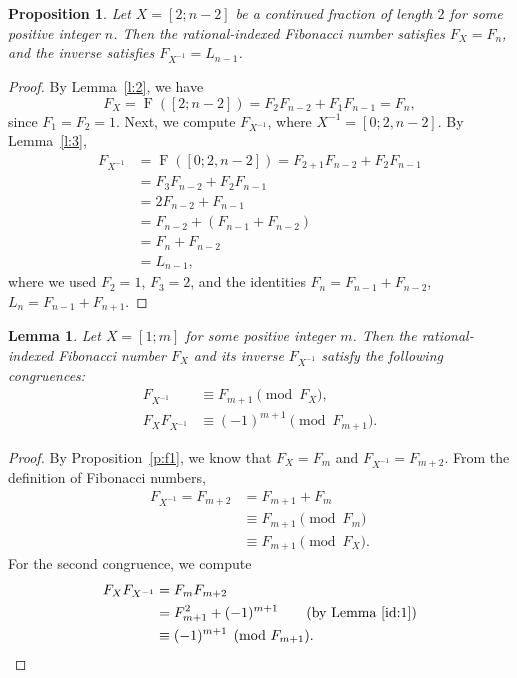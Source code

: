 \documentclass[11pt,reqno]{amsart}
\numberwithin{equation}{section}
\numberwithin{table}{section}
\numberwithin{figure}{section}
\DeclareMathOperator{\F}{F}
\theoremstyle{plain}
\newtheorem{lemma}[thm]{Lemma}
\newtheorem{proposition}[thm]{Proposition}
\theoremstyle{definition}
\theoremstyle{remark}
\begin{document}
\begin{proposition}\label{p:f2}	Let $X = [2; n-2]$ be a continued fraction of length $2$ for some positive integer $n$. 	Then the rational-indexed Fibonacci number satisfies $F_X = F_n$, and the inverse satisfies $F_{X^{-1}} = L_{n-1}$.\end{proposition}\begin{proof}	By Lemma~\ref{l:2}, we have	\[	F_X = \F([2; n-2]) = F_2F_{n-2} + F_1F_{n-1} = F_n, 	\]	since $F_1 = F_2 = 1$.		Next, we compute $F_{X^{-1}}$, where $X^{-1} = [0; 2, n-2]$. By Lemma~\ref{l:3},	\begin{align*}		F_{X^{-1}} &= \F([0; 2, n-2]) = F_{2+1}F_{n-2} + F_2F_{n-1} \\		&= F_3F_{n-2} + F_2F_{n-1} \\		&= 2F_{n-2} + F_{n-1} \\		&= F_{n-2} + (F_{n-1}+F_{n-2}) \\		&= F_{n} + F_{n-2} \\		&= L_{n-1},	\end{align*}	where we used $F_2 = 1$, $F_3 = 2$, and the identities $F_n = F_{n-1} + F_{n-2}$, $L_n = F_{n-1}+F_{n+1}$.\end{proof}\begin{lemma}\label{in:f1}	Let $X = [1; m]$ for some positive integer $m$. 	Then the rational-indexed Fibonacci number $F_X$ and its inverse $F_{X^{-1}}$ satisfy the following congruences:	\begin{align}		F_{X^{-1}} &\equiv F_{m+1} \pmod{F_X}, \\		F_XF_{X^{-1}} &\equiv (-1)^{m+1} \pmod{F_{m+1}}.	\end{align}\end{lemma}
\begin{proof}	By Proposition~\ref{p:f1}, we know that $F_X = F_m$ and $F_{X^{-1}} = F_{m+2}$. 	From the definition of Fibonacci numbers,	\begin{align*}		F_{X^{-1}} = F_{m+2} &= F_{m+1} + F_{m} \\		&\equiv F_{m+1} \pmod{F_{m}} \\		&\equiv F_{m+1} \pmod{F_X}.	\end{align*}		For the second congruence, we compute	\begin{align*}		F_XF_{X^{-1}} &= F_mF_{m+2} \\		&= F_{m+1}^2 + (-1)^{m+1} \qquad \text{(by Lemma~\ref{id:1})} \\		&\equiv (-1)^{m+1} \pmod{F_{m+1}}. \qedhere	\end{align*}\end{proof}
\end{document}
